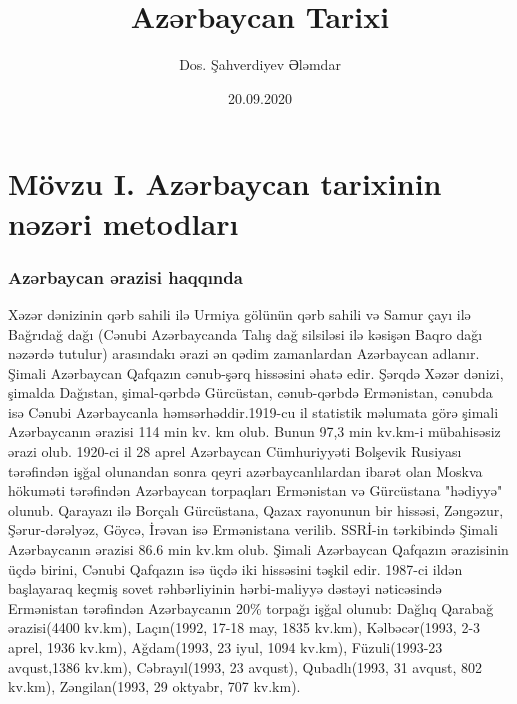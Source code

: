 \documentclass[a4paper,14pt]{article}
\title{Azərbaycan Tarixi}
\author{Dos. Şahverdiyev Ələmdar}
\date{20.09.2020}
\begin{document}
\maketitle
\newpage
\tableofcontents
\newpage
\part*{Mövzu I. Azərbaycan tarixinin nəzəri metodları}

\section{Azərbaycan ərazisi haqqında}
\qquad Xəzər dənizinin qərb sahili ilə Urmiya gölünün qərb sahili və Samur çayı ilə Bağrıdağ dağı (Cənubi  Azərbaycanda Talış dağ silsiləsi ilə kəsişən Baqro dağı nəzərdə tutulur) arasındakı ərazi ən qədim zamanlardan Azərbaycan adlanır. Şimali Azərbaycan Qafqazın cənub-şərq hissəsini əhatə edir. Şərqdə Xəzər dənizi, şimalda Dağıstan, şimal-qərbdə Gürcüstan, cənub-qərbdə Ermənistan, cənubda isə Cənubi Azərbaycanla həmsərhəddir.1919-cu il statistik məlumata görə şimali Azərbaycanın ərazisi 114 min kv. km olub. Bunun 97,3 min kv.km-i mübahisəsiz ərazi olub. 1920-ci il 28 aprel Azərbaycan Cümhuriyyəti Bolşevik Rusiyası tərəfindən işğal olunandan sonra qeyri azərbaycanlılardan ibarət olan Moskva hökuməti tərəfindən Azərbaycan torpaqları Ermənistan və Gürcüstana "hədiyyə" olunub. Qarayazı ilə Borçalı Gürcüstana, Qazax rayonunun bir hissəsi, Zəngəzur, Şərur-dərəlyəz, Göycə, İrəvan isə Ermənistana verilib. SSRİ-in tərkibində Şimali Azərbaycanın ərazisi 86.6 min kv.km olub. Şimali Azərbaycan Qafqazın ərazisinin üçdə birini, Cənubi Qafqazın isə üçdə iki hissəsini təşkil edir. 1987-ci ildən başlayaraq keçmiş sovet rəhbərliyinin hərbi-maliyyə dəstəyi nəticəsində Ermənistan tərəfindən Azərbaycanın 20\% torpağı işğal olunub: Dağlıq Qarabağ ərazisi(4400 kv.km), Laçın(1992, 17-18 may, 1835 kv.km), Kəlbəcər(1993, 2-3 aprel, 1936 kv.km), Ağdam(1993, 23 iyul, 1094 kv.km), Füzuli(1993-23 avqust,1386 kv.km), Cəbrayıl(1993, 23 avqust), Qubadlı(1993, 31 avqust, 802 kv.km), Zəngilan(1993, 29 oktyabr, 707 kv.km).
\end{document}
